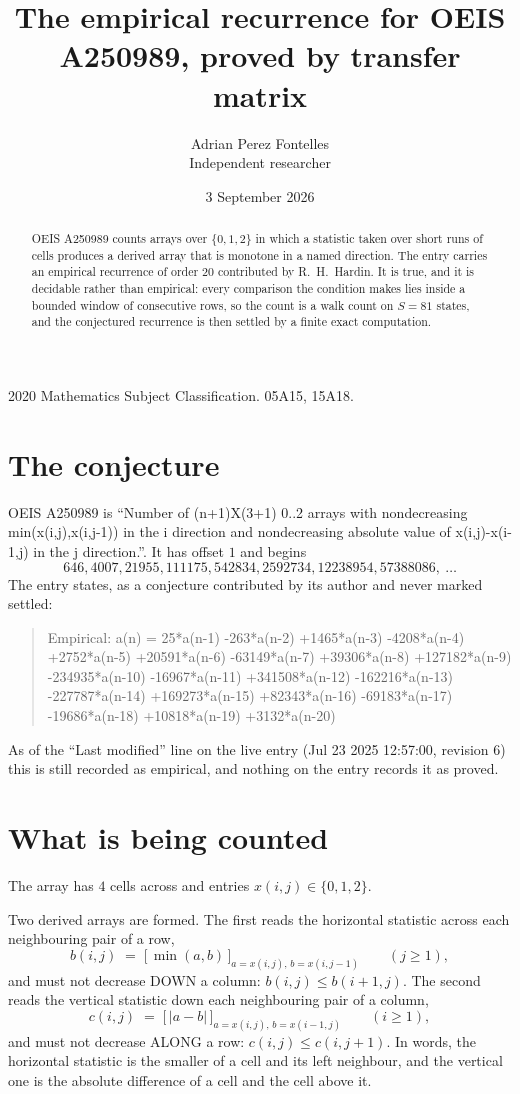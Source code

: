\documentclass[11pt,a4paper]{article}
\title{The empirical recurrence for OEIS A250989, proved by transfer matrix}
\author{Adrian Perez Fontelles\\ \small Independent researcher}
\date{3 September 2026}
\theoremstyle{plain}
\theoremstyle{definition}
\begin{document}
\maketitle

\begin{abstract}
OEIS A250989 counts arrays over $\{0,1,2\}$ in which a statistic taken over short runs
of cells produces a derived array that is monotone in a named direction. The entry carries an
empirical recurrence of order $20$ contributed by R.~H.~Hardin. It is true, and it is
decidable rather than empirical: every comparison the condition makes lies inside a bounded
window of consecutive rows, so the count is a walk count on $S=81$ states, and the
conjectured recurrence is then settled by a finite exact computation.
\end{abstract}

\noindent\small 2020 Mathematics Subject Classification. 05A15, 15A18.\normalsize

\section{The conjecture}

OEIS A250989 is ``Number of (n+1)X(3+1) 0..2 arrays with nondecreasing min(x(i,j),x(i,j-1)) in the i direction and nondecreasing absolute value of x(i,j)-x(i-1,j) in the j direction.''. It has offset $1$ and begins
\[
646, 4007, 21955, 111175, 542834, 2592734, 12238954, 57388086,\ \dots
\]
The entry states, as a conjecture contributed by its author and never marked settled:
\begin{quote}
Empirical: a(n) = 25*a(n-1) -263*a(n-2) +1465*a(n-3) -4208*a(n-4) +2752*a(n-5) +20591*a(n-6) -63149*a(n-7) +39306*a(n-8) +127182*a(n-9) -234935*a(n-10) -16967*a(n-11) +341508*a(n-12) -162216*a(n-13) -227787*a(n-14) +169273*a(n-15) +82343*a(n-16) -69183*a(n-17) -19686*a(n-18) +10818*a(n-19) +3132*a(n-20)
\end{quote}
As of the ``Last modified'' line on the live entry (Jul 23 2025 12:57:00, revision 6) this is still
recorded as empirical, and nothing on the entry records it as proved.

\section{What is being counted}

The array has $4$ cells across and entries $x(i,j)\in\{0,1,2\}$.

Two derived arrays are formed. The first reads the horizontal statistic across each
neighbouring pair of a row,
\[
b(i,j)\;=\;\bigl[\,\min(a,b)\,\bigr]_{a=x(i,j),\,b=x(i,j-1)}\qquad (j\ge1),
\]
and must not decrease DOWN a column: $b(i,j)\le b(i{+}1,j)$. The second reads the vertical
statistic down each neighbouring pair of a column,
\[
c(i,j)\;=\;\bigl[\,\lvert a-b\rvert\,\bigr]_{a=x(i,j),\,b=x(i{-}1,j)}\qquad (i\ge1),
\]
and must not decrease ALONG a row: $c(i,j)\le c(i,j{+}1)$. In words, the horizontal statistic
is the smaller of a cell and its left neighbour, and the vertical one is
the absolute difference of a cell and the cell above it.
\end{document}

